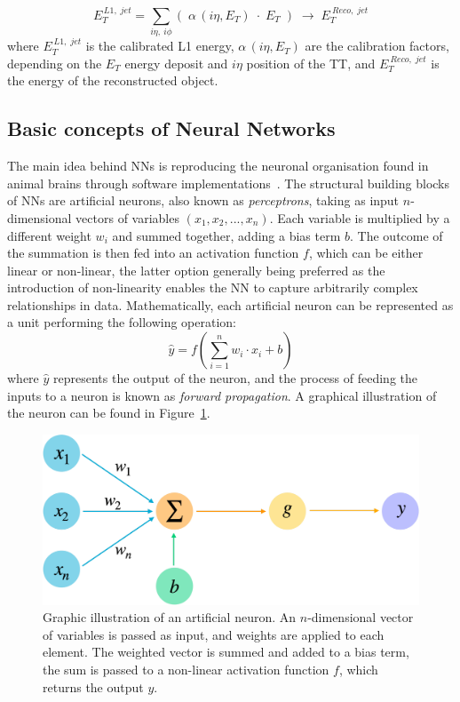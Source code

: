 \begin{equation}
    E_T^{\,L1,\;jet} = \sum_{i\eta,\:i\phi}\left(\;\alpha\,(i\eta,E_{T})\;\cdot\;E_{T}\;\right) 
    \;\longrightarrow\;
    E_T^{\:Reco,\;jet}
\label{eq:Training}
\end{equation}
where $E_T^{\,L1,\;jet}$ is the calibrated L1 energy, $\alpha\,(i\eta,E_{T})$ are the calibration factors, depending on the $E_T$ energy deposit and $i\eta$ position of the TT, and $E_T^{\:Reco,\;jet}$ is the energy of the reconstructed object.

\subsection{Basic concepts of Neural Networks}

The main idea behind NNs is reproducing the neuronal organisation found in animal brains through software implementations~\cite{1672070}.
The structural building blocks of NNs are artificial neurons, also known as \textit{perceptrons}, taking as input $n$-dimensional vectors of variables $(x_1,x_2,...,x_n)$. Each variable is multiplied by a different weight $w_i$ and summed together, adding a bias term $b$.
The outcome of the summation is then fed into an activation function $f$, which can be either linear or non-linear, the latter option generally being preferred as the introduction of non-linearity enables the NN to capture arbitrarily complex relationships in data.
Mathematically, each artificial neuron can be represented as a unit performing the following operation:
\begin{equation}
    \hat{y}=f\left( \sum_{i=1}^{n}w_i \cdot x_i + b \right)
\end{equation}
where $\hat{y}$ represents the output of the neuron, and the process of feeding the inputs to a neuron is known as \textit{forward propagation}. A graphical illustration of the neuron can be found in Figure~\ref{fig:Perceptron}.

\begin{figure}
    \centering
    \includegraphics[width=0.6\linewidth]{Figures/L1TP/Perceptron.pdf}
    \caption{Graphic illustration of an artificial neuron. An $n$-dimensional vector of variables is passed as input, and weights are applied to each element. The weighted vector is summed and added to a bias term, the sum is passed to a non-linear activation function $f$, which returns the output $y$.}
    \label{fig:Perceptron}
\end{figure}

